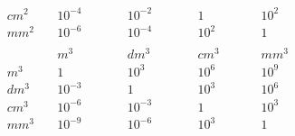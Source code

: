 \documentclass[twocolumn]{article}
\begin{document}
\begin{multicols}{2}
\begin{alignat*}{4}
		cm^2 	\quad	& 10^{-4}\quad &&\quad 10^{-2}\quad &&\quad 1\quad &&\quad 10^{2}\quad \quad \\
		mm^2 	\quad	& 10^{-6}\quad &&\quad 10^{-4}\quad &&\quad 10^{2}\quad &&\quad 1\quad \quad \\
	\end{alignat*}
	\begin{alignat*}{4} 
			& m^3 \quad && \quad dm^3 && \quad cm^3 && \quad mm^3 \\
		m^3 	\quad& 1\quad &&\quad 10^3\quad &&\quad 10^6\quad &&\quad 10^9\quad \\
		dm^3 	\quad& 10^{-3}\quad &&\quad 1\quad &&\quad 10^{3}\quad &&\quad 10^{6}\quad \quad \\
		cm^3 	\quad& 10^{-6}\quad &&\quad 10^{-3}\quad &&\quad 1\quad &&\quad 10^{3}\quad \quad \\
		mm^3 	\quad& 10^{-9}\quad &&\quad 10^{-6}\quad &&\quad 10^{3}\quad &&\quad 1\quad \quad \\
	\end{alignat*}
\end{multicols}
\end{document}
